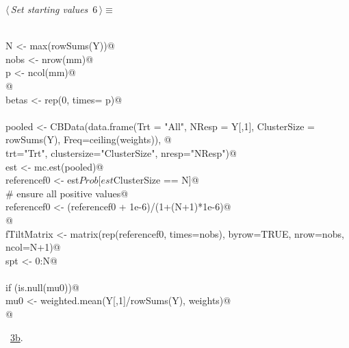 \documentclass[reqno]{amsart}
\renewcommand{\NWtarget}[2]{\hypertarget{#1}{#2}}
\renewcommand{\NWlink}[2]{\hyperlink{#1}{#2}}
\begin{document}
\begin{flushleft} \small\label{scrap8}\raggedright\small
\NWtarget{nuweb6}{} $\langle\,${\itshape Set starting values}\nobreak\ {\footnotesize {6}}$\,\rangle\equiv$
\vspace{-1ex}
\begin{list}{}{} \item
\mbox{}\verb@@\\
\mbox{}\verb@  N <- max(rowSums(Y))@\\
\mbox{}\verb@  nobs <- nrow(mm)@\\
\mbox{}\verb@  p <- ncol(mm)@\\
\mbox{}\verb@  @\\
\mbox{}\verb@  betas <- rep(0, times= p)@\\
\mbox{}\verb@@\\
\mbox{}\verb@  pooled <- CBData(data.frame(Trt = "All", NResp = Y[,1], ClusterSize = rowSums(Y), Freq=ceiling(weights)), @\\
\mbox{}\verb@                    trt="Trt", clustersize="ClusterSize", nresp="NResp")@\\
\mbox{}\verb@  est <- mc.est(pooled)@\\
\mbox{}\verb@  referencef0 <- est$Prob[est$ClusterSize == N]@\\
\mbox{}\verb@  # ensure all positive values@\\
\mbox{}\verb@  referencef0 <- (referencef0 + 1e-6)/(1+(N+1)*1e-6)@\\
\mbox{}\verb@  @\\
\mbox{}\verb@  fTiltMatrix <- matrix(rep(referencef0, times=nobs), byrow=TRUE, nrow=nobs, ncol=N+1)@\\
\mbox{}\verb@  spt <- 0:N@\\
\mbox{}\verb@@\\
\mbox{}\verb@  if (is.null(mu0))@\\
\mbox{}\verb@    mu0 <- weighted.mean(Y[,1]/rowSums(Y), weights)@\\
\mbox{}\verb@  @\\
\mbox{}\verb@@{\NWsep}
\end{list}
\vspace{-1.5ex}
\footnotesize
\begin{list}{}{\setlength{\itemsep}{-\parsep}\setlength{\itemindent}{-\leftmargin}}
\item \NWtxtMacroRefIn\ \NWlink{nuweb3b}{3b}.

\item{}
\end{list}
\vspace{4ex}
\end{flushleft}
\end{document}
